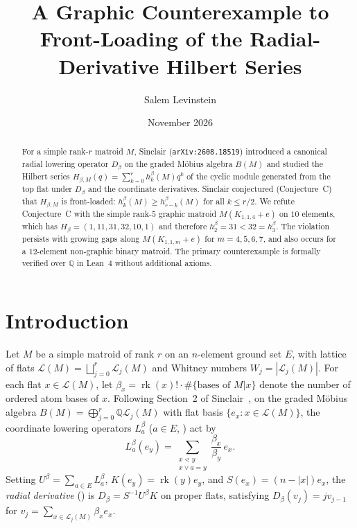 \documentclass[11pt]{article}
\title{A Graphic Counterexample to Front-Loading of the Radial-Derivative Hilbert Series}
\author{Salem Levinstein}
\date{November 2026}
\theoremstyle{remark}
\DeclareMathOperator{\rk}{rk}
\begin{document}
\maketitle

\begin{abstract}
For a simple rank-$r$ matroid $M$, Sinclair (\texttt{arXiv:2608.18519}) introduced a canonical radial lowering operator $D_\beta$ on the graded M\"obius algebra $B(M)$ and studied the Hilbert series $H_{\beta, M}(q) = \sum_{k=0}^r h_k^\beta(M) q^k$ of the cyclic module generated from the top flat under $D_\beta$ and the coordinate derivatives. Sinclair conjectured (Conjecture~C) that $H_{\beta, M}$ is front-loaded: $h_k^\beta(M) \ge h_{r-k}^\beta(M)$ for all $k \le r/2$. We refute Conjecture~C with the simple rank-$5$ graphic matroid $M(K_{1,1,4} + e)$ on $10$ elements, which has $H_\beta = (1, 11, 31, 32, 10, 1)$ and therefore $h_2^\beta = 31 < 32 = h_3^\beta$. The violation persists with growing gaps along $M(K_{1,1,m} + e)$ for $m = 4, 5, 6, 7$, and also occurs for a $12$-element non-graphic binary matroid. The primary counterexample is formally verified over $\mathbb{Q}$ in Lean~4 without additional axioms.
\end{abstract}

\section{Introduction}

Let $M$ be a simple matroid of rank $r$ on an $n$-element ground set $E$, with lattice of flats $\mathcal{L}(M) = \bigsqcup_{j=0}^r \mathcal{L}_j(M)$ and Whitney numbers $W_j = |\mathcal{L}_j(M)|$. For each flat $x \in \mathcal{L}(M)$, let $\beta_x = \rk(x)! \cdot \#\{\text{bases of } M|x\}$ denote the number of ordered atom bases of $x$. Following Section~2 of Sinclair~\cite{Sinclair2026}, on the graded M\"obius algebra $B(M) = \bigoplus_{j=0}^r \mathbb{Q}\mathcal{L}_j(M)$ with flat basis $\{e_x : x \in \mathcal{L}(M)\}$, the coordinate lowering operators $L_a^\beta$ ($a \in E$, \cite[Proposition~2.2]{Sinclair2026}) act by
\[
L_a^\beta(e_y) = \sum_{\substack{x \lessdot y \\ x \vee a = y}} \frac{\beta_x}{\beta_y}\, e_x.
\]
Setting $U^\beta = \sum_{a \in E} L_a^\beta$, $K(e_y) = \rk(y) e_y$, and $S(e_x) = (n - |x|) e_x$, the \emph{radial derivative} (\cite[Proposition~2.3]{Sinclair2026}) is $D_\beta = S^{-1} U^\beta K$ on proper flats, satisfying $D_\beta(v_j) = j v_{j-1}$ for $v_j = \sum_{x \in \mathcal{L}_j(M)} \beta_x e_x$.
\end{document}
